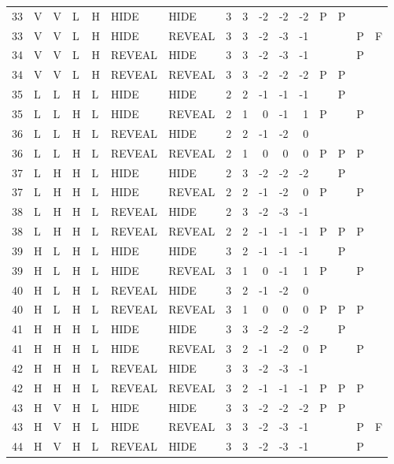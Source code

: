 \begin{longtable}{rllllllrrrrrllll}
  33 & V & V & L & H & HIDE & HIDE & 3 & 3 & -2 & -2 & -2 & P & P &  &  \\ 
  33 & V & V & L & H & HIDE & REVEAL & 3 & 3 & -2 & -3 & -1 &  &  & P & F \\ 
  34 & V & V & L & H & REVEAL & HIDE & 3 & 3 & -2 & -3 & -1 &  &  & P &  \\ 
  34 & V & V & L & H & REVEAL & REVEAL & 3 & 3 & -2 & -2 & -2 & P & P &  &  \\ 
  35 & L & L & H & L & HIDE & HIDE & 2 & 2 & -1 & -1 & -1 &  & P &  &  \\ 
  35 & L & L & H & L & HIDE & REVEAL & 2 & 1 & 0 & -1 & 1 & P &  & P &  \\ 
  36 & L & L & H & L & REVEAL & HIDE & 2 & 2 & -1 & -2 & 0 &  &  &  &  \\ 
  36 & L & L & H & L & REVEAL & REVEAL & 2 & 1 & 0 & 0 & 0 & P & P & P &  \\ 
  37 & L & H & H & L & HIDE & HIDE & 2 & 3 & -2 & -2 & -2 &  & P &  &  \\ 
  37 & L & H & H & L & HIDE & REVEAL & 2 & 2 & -1 & -2 & 0 & P &  & P &  \\ 
  38 & L & H & H & L & REVEAL & HIDE & 2 & 3 & -2 & -3 & -1 &  &  &  &  \\ 
  38 & L & H & H & L & REVEAL & REVEAL & 2 & 2 & -1 & -1 & -1 & P & P & P &  \\ 
  39 & H & L & H & L & HIDE & HIDE & 3 & 2 & -1 & -1 & -1 &  & P &  &  \\ 
  39 & H & L & H & L & HIDE & REVEAL & 3 & 1 & 0 & -1 & 1 & P &  & P &  \\ 
  40 & H & L & H & L & REVEAL & HIDE & 3 & 2 & -1 & -2 & 0 &  &  &  &  \\ 
  40 & H & L & H & L & REVEAL & REVEAL & 3 & 1 & 0 & 0 & 0 & P & P & P &  \\ 
  41 & H & H & H & L & HIDE & HIDE & 3 & 3 & -2 & -2 & -2 &  & P &  &  \\ 
  41 & H & H & H & L & HIDE & REVEAL & 3 & 2 & -1 & -2 & 0 & P &  & P &  \\ 
  42 & H & H & H & L & REVEAL & HIDE & 3 & 3 & -2 & -3 & -1 &  &  &  &  \\ 
  42 & H & H & H & L & REVEAL & REVEAL & 3 & 2 & -1 & -1 & -1 & P & P & P &  \\ 
  43 & H & V & H & L & HIDE & HIDE & 3 & 3 & -2 & -2 & -2 & P & P &  &  \\ 
  43 & H & V & H & L & HIDE & REVEAL & 3 & 3 & -2 & -3 & -1 &  &  & P & F \\ 
  44 & H & V & H & L & REVEAL & HIDE & 3 & 3 & -2 & -3 & -1 &  &  & P &  \\ 

\end{longtable}
